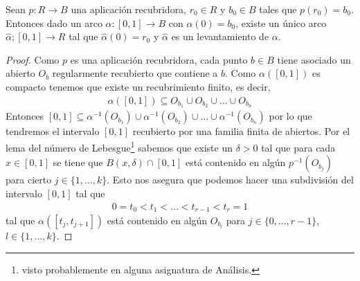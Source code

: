 \begin{ejemplo}
\begin{figure}[H]
%
    \end{figure}%

\end{ejemplo}

\begin{lema}
    Sean $p:R\to B$ una aplicación recubridora, $r_0\in R$ y $b_0\in B$ tales que $p(r_0)=b_0$. Entonces dado un arco $\alpha:[0,1]\to B$ con $\alpha(0)=b_0$, existe un único arco $\hat{\alpha};[0,1]\to R$ tal que $\hat{\alpha}(0) = r_0$ y $\hat{\alpha}$ es un levantamiento de $\alpha$.

    \begin{proof}
        Como $p$ es una aplicación recubridora, cada punto $b\in B$ tiene asociado un abierto $O_b$ regularmente recubierto que contiene a $b$. Como $\alpha([0,1])$ es compacto tenemos que existe un recubrimiento finito, es decir,
        \begin{gather*}
            \alpha([0,1]) \subseteq O_{b_1} \cup O_{b_2}\cup \dots \cup O_{b_n}
        \end{gather*}
        Entonces $[0,1]\subseteq \alpha^{-1}( O_{b_1}) \cup \alpha^{-1}(O_{b_2})\cup \dots \cup \alpha^{-1}(O_{b_n})$ por lo que tendremos el intervalo $[0,1]$ recubierto por una familia finita de abiertos. Por el lema del número de Lebesgue\footnote{visto probablemente en alguna asignatura de Análisis.} sabemos que existe un $\delta>0$ tal que para cada $x\in[0,1]$ se tiene que $B(x,\delta)\cap[0,1]$ está contenido en algún $p^{-1}(O_{b_j})$ para cierto $j\in\{1,\dots,k\}$. Esto nos asegura que podemos hacer una subdivisión del intervalo $[0,1]$ tal que
        \begin{gather*}
            0 = t_0 < t_1 < \dots < t_{r-1} < t_r = 1
        \end{gather*}
        tal que $\alpha([t_j, t_{j+1}])$ está contenido en algún $O_{b_l}$ para $j\in\{0,\dots,r-1\}$, $l\in\{1,\dots,k\}$.


\end{proof}
\end{lema}

